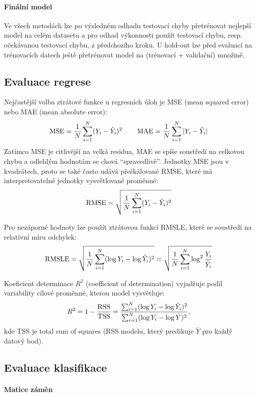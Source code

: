 \paragraph{Finální model} Ve všech metodách lze po výsledném odhadu testovací chyby přetrénovat nejlepší model na celém datasetu a pro odhad výkonnosti použít testovací chybu, resp. očekávanou testovací chybu, z předchozího kroku. U hold-out lze před evaluací na trénovacích datech ještě přetrénovat model na (trénovací + validační) množině.

\subsection{Evaluace regrese}

Nejčastější volba ztrátové funkce u regresních úloh je MSE (mean squared error) nebo MAE (mean absolute error):
\[
    \operatorname{MSE} = \frac{1}{N} \sum_{i=1}^{N} (Y_i - \hat{Y}_i)^2
    \qquad
    \operatorname{MAE} = \frac{1}{N} \sum_{i=1}^{N} |Y_i - \hat{Y}_i|
\]
Zatímco MSE je citlivější na velká residua, MAE se spíše soustředí na celkovou chybu a odlehlým hodnotám se chová ``spravedlivě''. Jednotky MSE jsou v kvadrátech, proto se také často udává přeškálované RMSE, které má interpretovatelné jednotky vysvětlované proměnné:
\[
    \operatorname{RMSE} = \sqrt{\frac{1}{N} \sum_{i=1}^{N} (Y_i - \hat{Y}_i)^2}
\]

Pro nezáporné hodnoty lze použít ztrátovou funkcí RMSLE, které se soustředí na relativní míru odchylek:
\[
    \operatorname{RMSLE} = \sqrt{\frac{1}{N} \sum_{i=1}^{N} (\log Y_i - \log \hat{Y}_i)^2}
    = \sqrt{\frac{1}{N} \sum_{i=1}^{N} \log^2 \frac{Y_i}{\hat{Y}_i}}
\]

Koeficient determinace $R^2$ (coefficient of determination) vyjadřuje podíl variability cílové proměnné, kterou model vysvětluje:
\[
    R^2 = 1 - \frac{\operatorname{RSS}}{\operatorname{TSS}}
    = \frac{
        \sum_{i=1}^{N} (\log Y_i - \log \hat{Y}_i)^2
    }{
        \sum_{i=1}^{N} (\log Y_i - \log \bar{Y})^2
    },
\]
kde TSS je total sum of squares (RSS modelu, který predikuje $\bar{Y}$ pro každý datový bod).

\subsection{Evaluace klasifikace}

\paragraph{Matice záměn}

